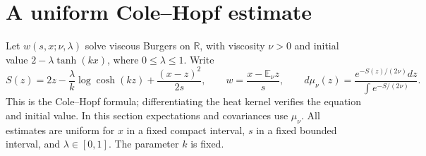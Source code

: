\documentclass[11pt]{article}
\begin{document}
\section{A uniform Cole--Hopf estimate}
Let $w(s,x;\nu,\lambda)$ solve viscous Burgers on $\mathbb R$, with viscosity $\nu>0$ and initial value $2-\lambda\tanh(kx)$, where $0\le\lambda\le1$. Write
\begin{equation}\label{action}
 S(z)=2z-\frac\lambda k\log\cosh(kz)+\frac{(x-z)^2}{2s},\qquad
 w=\frac{x-\mathbb E_\nu z}{s},\qquad
 d\mu_\nu(z)=\frac{e^{-S(z)/(2\nu)}dz}{\int e^{-S/(2\nu)}}.
\end{equation}
This is the Cole--Hopf formula; differentiating the heat kernel verifies the equation and initial value. In this section expectations and covariances use $\mu_\nu$. All estimates are uniform for $x$ in a fixed compact interval, $s$ in a fixed bounded interval, and $\lambda\in[0,1]$. The parameter $k$ is fixed.
\end{document}
